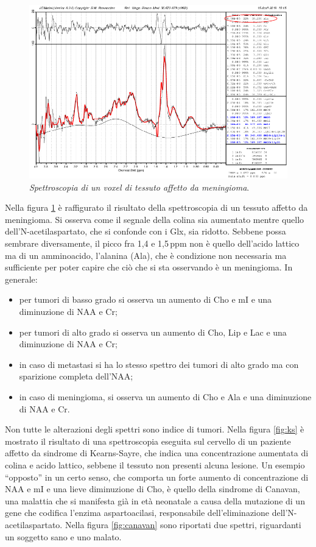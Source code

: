\documentclass{report}
\newcommand{\virgolette}[1]{``#1''}
\newcommand{\figref}[1]{figura \ref{#1}}
\numberwithin{equation}{section}
\numberwithin{figure}{section}
\begin{document}
\begin{figure}[htp]
\centering
\includegraphics[scale=0.96]{immagini/meni.png}
\caption{\label{fig:meni} \textit{Spettroscopia di un voxel di tessuto affetto da meningioma}.}
\end{figure}

Nella \figref{fig:meni} è raffigurato il risultato della spettroscopia di un tessuto affetto da meningioma. Si osserva come il segnale della colina sia aumentato mentre quello dell'N-acetilaspartato, che si confonde con i Glx, sia ridotto. Sebbene possa sembrare diversamente, il picco fra 1,4 e 1,5\,ppm non è quello dell'acido lattico ma di un amminoacido, l'alanina (Ala), che è condizione non necessaria ma sufficiente per poter capire che ciò che si sta osservando è un meningioma. In generale:
\begin{itemize}[label=$-$]
    \item per tumori di basso grado si osserva un aumento di Cho e mI e una diminuzione di NAA e Cr;
    \item per tumori di alto grado si osserva un aumento di Cho, Lip e Lac e una diminuzione di NAA e Cr;
    \item in caso di metastasi si ha lo stesso spettro dei tumori di alto grado ma con sparizione completa dell'NAA;
    \item in caso di meningioma, si osserva un aumento di Cho e Ala e una diminuzione di NAA e Cr.
\end{itemize}

Non tutte le alterazioni degli spettri sono indice di tumori. Nella \figref{fig:ks} è mostrato il risultato di una spettroscopia eseguita sul cervello di un paziente affetto da sindrome di Kearns-Sayre, che indica una concentrazione aumentata di colina e acido lattico, sebbene il tessuto non presenti alcuna lesione. Un esempio \virgolette{opposto} in un certo senso, che comporta un forte aumento di concentrazione di NAA e mI e una lieve diminuzione di Cho, è quello della sindrome di Canavan, una malattia che si manifesta già in età neonatale a causa della mutazione di un gene che codifica l'enzima aspartoacilasi, responsabile dell'eliminazione dell'N-acetilaspartato. Nella \figref{fig:canavan} sono riportati due spettri, riguardanti un soggetto sano e uno malato.
\end{document}
